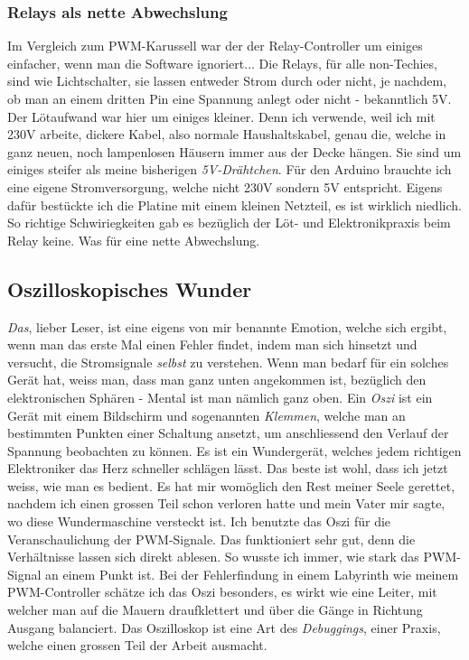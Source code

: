 \documentclass[12pt,titlepage,a4paper]{article}
\begin{document}
\subsubsection{Relays als nette Abwechslung}
Im Vergleich zum PWM-Karussell war der der Relay-Controller um einiges einfacher, wenn man die Software ignoriert... Die Relays, für alle non-Techies, sind wie Lichtschalter, sie lassen entweder Strom durch oder nicht, je nachdem, ob man an einem dritten Pin eine Spannung anlegt oder nicht - bekanntlich 5V. Der Lötaufwand war hier um einiges kleiner. Denn ich verwende, weil ich mit 230V arbeite, dickere Kabel, also normale Haushaltskabel, genau die, welche in ganz neuen, noch lampenlosen Häusern immer aus der Decke hängen. Sie sind um einiges steifer als meine bisherigen \textit{5V-Drähtchen}. Für den Arduino brauchte ich eine eigene Stromversorgung, welche nicht 230V sondern 5V entspricht. Eigens dafür bestückte ich die Platine mit einem kleinen Netzteil, es ist wirklich niedlich. So richtige Schwiriegkeiten gab es bezüglich der Löt- und Elektronikpraxis beim Relay keine. Was für eine nette Abwechslung.

\subsection{Oszilloskopisches Wunder}
\textit{Das}, lieber Leser, ist eine eigens von mir benannte Emotion, welche sich ergibt, wenn man das erste Mal einen Fehler findet, indem man sich hinsetzt und versucht, die Stromsignale \textit{selbst} zu verstehen. Wenn man bedarf für ein solches Gerät hat, weiss man, dass man ganz unten angekommen ist, bezüglich den elektronischen Sphären - Mental ist man nämlich ganz oben. Ein \textit{Oszi} ist ein Gerät mit einem Bildschirm und sogenannten \textit{Klemmen}, welche man an bestimmten Punkten einer Schaltung ansetzt, um anschliessend den Verlauf der Spannung beobachten zu können. Es ist ein Wundergerät, welches jedem richtigen Elektroniker das Herz schneller schlägen lässt. Das beste ist wohl, dass ich jetzt weiss, wie man es bedient. Es hat mir womöglich den Rest meiner Seele gerettet, nachdem ich einen grossen Teil schon verloren hatte und mein Vater mir sagte, wo diese Wundermaschine versteckt ist. Ich benutzte das Oszi  für die Veranschaulichung der PWM-Signale. Das funktioniert sehr gut, denn die Verhältnisse lassen sich direkt ablesen. So wusste ich immer, wie stark das PWM-Signal an einem Punkt ist. Bei der Fehlerfindung in einem Labyrinth wie meinem PWM-Controller schätze ich das Oszi besonders, es wirkt wie eine Leiter, mit welcher man auf die Mauern draufklettert und über die Gänge in Richtung Ausgang balanciert. Das Oszilloskop ist eine Art des \textit{Debuggings}, einer Praxis, welche einen grossen Teil der Arbeit ausmacht.
\end{document}
